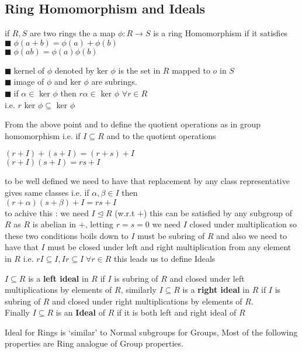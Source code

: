 \documentclass[11pt]{extarticle}
\newcommand{\ra}{\rightarrow}
\newcommand{\tbx}[2][]{
	\begin{tcolorbox}[enhanced,breakable,size=small,colback=black!2!white,title={#1},arc is angular, arc=1.5mm,drop fuzzy shadow]
		#2
	\end{tcolorbox}
}
\newcommand{\y}{$\blacksquare\;$}
\begin{document}
\begin{multicols}{2}
		\section{Ring Homomorphism and Ideals}
		
\tbx{if $ R,S $ are two rings the a map $ \phi :R \ra S $ is a ring Homomorphism if it satisfies
			\y $ \phi(a+b)=\phi(a)+\phi(b) $ \\
			\y $ \phi(ab)=\phi(a)\phi(b) $ \\
			} 
\tbx{\y kernel of $ \phi  $ denoted by ker $\phi $ is the set in $ R $ mapped to $ o $ in $ S $
\\
\y image of $ \phi $ and ker $\phi  $ are subrings.\\
\y if $\alpha\in   $ ker $ \phi $ then $ r\alpha \in  $ ker $ \phi $ $ \forall r \in R $\\
			i.e. $ r $ ker $ \phi \subseteq  $ ker $ \phi $
			} 
\tbx[Concept of Ideal]{From the above point and to define the quotient operations as in group homomorphism i.e. if  $ I \subseteq R $ and to the quotient operations 
			\begin{center}
				$ (r+I)+(s+I)=(r+s)+I $\\
				$ (r+I)(s+I)=rs+I $
			\end{center}
			to be well defined we need to have that replacement by any class representative gives same classes i.e.
			if $ \alpha, \beta \in I $ then \\
			$ (r+\alpha)(s+\beta)+I=rs+I $\\
			to achive this : we need $ I \trianglelefteq R $ (w.r.t $ + $) this can be satisfied by any subgroup of $ R $ as $ R $ is abelian in $ + $, letting $ r=s=0 $ we need $ I $ closed under multiplication so these two conditions boils down to $ I $ must be subring of $ R $ 
			and also we need to have that $ I $ must be closed under left and right multiplication from any element in $ R $
			i.e. $ rI \subseteq I, Ir\subseteq I \; \forall r\in R $ this leads us to define Ideals
			} 
\tbx{$I \subseteq R  $ is a \textbf{left ideal} in $ R $ if $ I $ is subring of $ R $ and closed under left multiplications by elements of $ R $, similarly $I \subseteq R  $ is a \textbf{right ideal} in $ R $ if $ I $ is subring of $ R $ and closed under right multiplications by elements of $ R $.\\
			Finally $ I \subseteq R $ is an \textbf{Ideal }of $ R $ if it is both left and right ideal of $ R $
			} 
\tbx{Ideal for Rings is `similar' to Normal subgroups for Groups, Most of the following properties are Ring analogue of Group properties.
}
\end{multicols}
\end{document}
